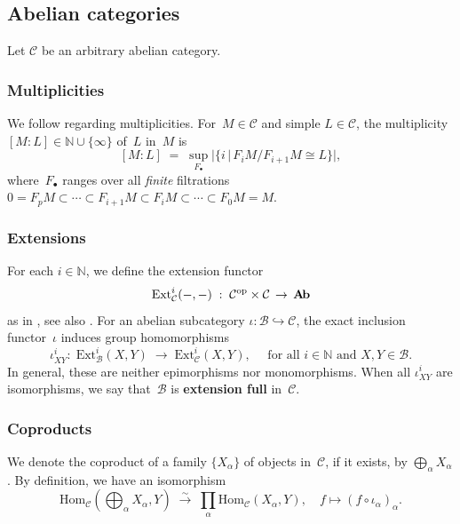 \documentclass[11pt]{amsart}
\newcommand{\Ab}{\mathbf{A\hspace{-0.5mm}b}}
\newcommand{\cB}{\mathcal B}
\newcommand{\Hom}{\mathrm{Hom}}
\newcommand{\Ext}{\mathrm{Ext}}
\newcommand{\op}{{\rm op}}
\newcommand{\cC}{\mathcal{C}}
\newcommand{\mN}{\mathbb{N}}
\numberwithin{equation}{section}
\theoremstyle{plain}
\theoremstyle{remark}
\theoremstyle{remark}
\theoremstyle{construction}
\begin{document}
\subsection{Abelian categories}
Let $\cC$ be an arbitrary abelian category.

\subsubsection{Multiplicities}
We follow \cite[Definition~4.1]{Soergel} regarding multiplicities.
For~$M\in \cC$ and simple $L\in\cC$, the multiplicity $[M:L]\in\mN\cup\{\infty\}$ of~$L$ in~$M$ is 
$$[M:L]\;=\;\sup_{F_\bullet}|\{i\,|\,F_iM/F_{i+1}M\cong L\}|,$$
where~$F_\bullet$ ranges over all {\em finite} filtrations $0=F_pM\subset\cdots \subset F_{i+1}M\subset F_iM\subset\cdots\subset F_0M=M$.




\subsubsection{Extensions}
 For each $i\in\mN$, we define the extension functor
$$\Ext_{\cC}^i(-,-)\;:\;\cC^{\op}\times\cC\,\to\, \Ab$$
 as in \cite[III.3]{Ve}, see also \cite[Section~2.1]{CM}. For an abelian subcategory $\iota:\cB\hookrightarrow \cC$, the exact inclusion functor~$\iota$ induces group homomorphisms
\begin{equation}\label{XYi}\iota_{XY}^{i}:\;\Ext^i_{\cB}(X,Y)\;\to\;\Ext^i_{\cC}(X,Y),\quad\mbox{ for all $i\in\mN$ and~$X,Y\in\cB$.}\end{equation}
In general, these are neither epimorphisms nor monomorphisms. When all $\iota_{XY}^i$ are isomorphisms, we say that~$\cB$ is {\bf extension full} in~$\cC$. 

\subsubsection{Coproducts}We denote the coproduct of a family $\{X_\alpha\}$ of objects in~$\cC$, if it exists, by $\bigoplus_\alpha X_\alpha$. By definition, we have an isomorphism
\begin{equation}\label{eqCo}\Hom_{\cC}\left(\bigoplus_\alpha X_\alpha,Y\right)\;\stackrel{\sim}{\to}\; \prod_\alpha\Hom_{\cC}(X_\alpha,Y),\quad f\mapsto (f\circ\iota_\alpha)_\alpha.\end{equation}
\end{document}
